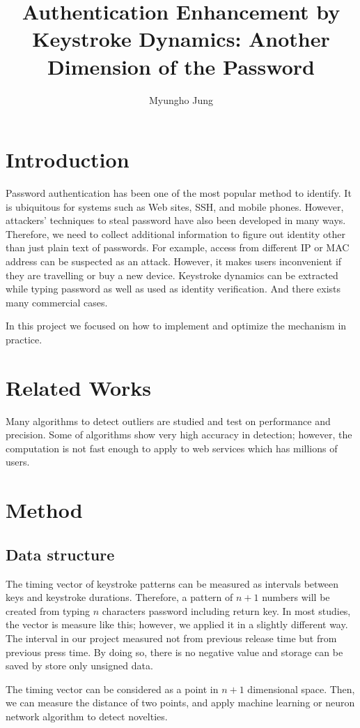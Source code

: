 \documentclass[twocolumn,showpacs,%
  nofootinbib,aps,%
  eqsecnum,prd,notitlepage,showkeys,10pt]{revtex4-1}
\begin{document}
\title{Authentication Enhancement by Keystroke Dynamics: Another Dimension of the Password }
\author{Myungho Jung}

\begin{abstract}
\end{abstract}

\maketitle

\section{Introduction}
Password authentication has been one of the most popular method to identify. It is ubiquitous for systems such as Web sites, SSH, and mobile phones. However, attackers' techniques to steal password have also been developed in many ways. Therefore, we need to collect additional information to figure out identity other than just plain text of passwords. For example, access from different IP or MAC address can be suspected as an attack. However, it makes users inconvenient if they are travelling or buy a new device. Keystroke dynamics can be extracted while typing password as well as used as identity verification\cite{gaines1980authentication}. And there exists many commercial cases\cite{banerjee2012biometric}.\par
In this project we focused on how to implement and optimize the mechanism in practice.

\section{Related Works}
Many algorithms to detect outliers are studied and test on performance and precision\cite{shanmugapriya2009survey}. Some of algorithms show very high accuracy in detection; however, the computation is not fast enough to apply to web services which has millions of users.

\section{Method}
\subsection{Data structure}
The timing vector of keystroke patterns can be measured as intervals between keys and keystroke durations\cite{cho2000web}. Therefore, a pattern of $n+1$ numbers will be created from typing $n$ characters password including return key. In most studies, the vector is measure like this; however, we applied it in a slightly different way. The interval in our project measured not from previous release time but from previous press time. By doing so, there is no negative value and storage can be saved by store only unsigned data.\par
The timing vector can be considered as a point in $n+1$ dimensional space. Then, we can measure the distance of two points, and apply machine learning or neuron network algorithm to detect novelties. 
\end{document}
